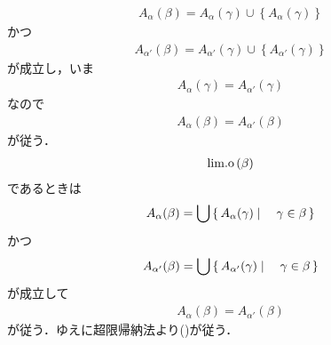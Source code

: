 \begin{sketch}
\begin{description}
\begin{align}
					A_\alpha(\beta) = A_\alpha(\gamma) \cup \left\{A_\alpha(\gamma)\right\}
				\end{align}
				かつ
				\begin{align}
					A_{\alpha'}(\beta) = A_{\alpha'}(\gamma) \cup \left\{A_{\alpha'}(\gamma)\right\}
				\end{align}
				が成立し，いま
				\begin{align}
					A_\alpha(\gamma) = A_{\alpha'}(\gamma)
				\end{align}
				なので
				\begin{align}
					A_\alpha(\beta) = A_{\alpha'}(\beta)
				\end{align}
				が従う．
				\begin{align}
					\mathrm{lim.o}\left(\beta\right)
				\end{align}
				であるときは
				\begin{align}
					A_\alpha(\beta) = \bigcup \left\{\, A_\alpha(\gamma) \mid \quad \gamma \in \beta\, \right\}
				\end{align}
				かつ
				\begin{align}
					A_{\alpha'}(\beta) = \bigcup \left\{\, A_{\alpha'}(\gamma) \mid \quad \gamma \in \beta\, \right\}
				\end{align}
				が成立して
				\begin{align}
					A_\alpha(\beta) = A_{\alpha'}(\beta)
				\end{align}
				が従う．ゆえに超限帰納法より()が従う．
				

\end{description}
\end{sketch}
